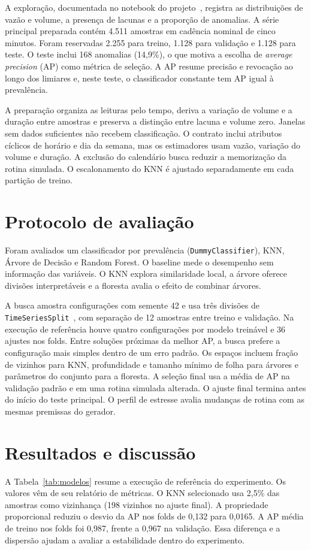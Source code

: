 \documentclass[12pt]{article}
\begin{document}
A exploração, documentada no notebook do projeto~\cite{aquaflow}, registra as distribuições de vazão e volume, a presença de lacunas e a proporção de anomalias. A série principal preparada contém 4.511 amostras em cadência nominal de cinco minutos. Foram reservadas 2.255 para treino, 1.128 para validação e 1.128 para teste. O teste inclui 168 anomalias (14,9\%), o que motiva a escolha de \textit{average precision} (AP) como métrica de seleção. A AP resume precisão e revocação ao longo dos limiares e, neste teste, o classificador constante tem AP igual à prevalência.

A preparação organiza as leituras pelo tempo, deriva a variação de volume e a duração entre amostras e preserva a distinção entre lacuna e volume zero. Janelas sem dados suficientes não recebem classificação. O contrato inclui atributos cíclicos de horário e dia da semana, mas os estimadores usam vazão, variação do volume e duração. A exclusão do calendário busca reduzir a memorização da rotina simulada. O escalonamento do KNN é ajustado separadamente em cada partição de treino.

\section{Protocolo de avaliação}
Foram avaliados um classificador por prevalência (\texttt{DummyClassifier}), KNN, Árvore de Decisão e Random Forest. O baseline mede o desempenho sem informação das variáveis. O KNN explora similaridade local, a árvore oferece divisões interpretáveis e a floresta avalia o efeito de combinar árvores.

A busca amostra configurações com semente 42 e usa três divisões de \texttt{TimeSeriesSplit}~\cite{sklearn}, com separação de 12 amostras entre treino e validação. Na execução de referência houve quatro configurações por modelo treinável e 36 ajustes nos folds. Entre soluções próximas da melhor AP, a busca prefere a configuração mais simples dentro de um erro padrão. Os espaços incluem fração de vizinhos para KNN, profundidade e tamanho mínimo de folha para árvores e parâmetros do conjunto para a floresta. A seleção final usa a média de AP na validação padrão e em uma rotina simulada alterada. O ajuste final termina antes do início do teste principal. O perfil de estresse avalia mudanças de rotina com as mesmas premissas do gerador.

\section{Resultados e discussão}
A Tabela~\ref{tab:modelos} resume a execução de referência do experimento. Os valores vêm de seu relatório de métricas. O KNN selecionado usa 2,5\% das amostras como vizinhança (198 vizinhos no ajuste final). A propriedade proporcional reduziu o desvio da AP nos folds de 0,132 para 0,0165. A AP média de treino nos folds foi 0,987, frente a 0,967 na validação. Essa diferença e a dispersão ajudam a avaliar a estabilidade dentro do experimento.
\end{document}
